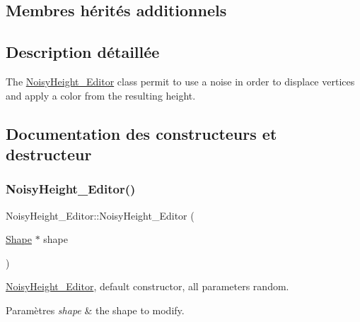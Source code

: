 \subsection*{Membres hérités additionnels}


\subsection{Description détaillée}
The \hyperlink{class_noisy_height___editor}{Noisy\+Height\+\_\+\+Editor} class permit to use a noise in order to displace vertices and apply a color from the resulting height. 

\subsection{Documentation des constructeurs et destructeur}
\mbox{\label{class_noisy_height___editor_ae4535fb17b29bd29d09dcadd5b9384e3}} 
\subsubsection{\texorpdfstring{Noisy\+Height\+\_\+\+Editor()}{NoisyHeight\_Editor()}\hspace{0.1cm}{\footnotesize\ttfamily [1/2]}}
{\footnotesize\ttfamily Noisy\+Height\+\_\+\+Editor\+::\+Noisy\+Height\+\_\+\+Editor (\begin{DoxyParamCaption}\item[{\hyperlink{class_shape}{Shape} $\ast$}]{shape }\end{DoxyParamCaption})}



\hyperlink{class_noisy_height___editor}{Noisy\+Height\+\_\+\+Editor}, default constructor, all parameters random. 


\begin{DoxyParams}{Paramètres}
{\em shape} & the shape to modify. \\
\hline
\end{DoxyParams}
\mbox{\label{class_noisy_height___editor_ac56426a50e5adf94c8b2a4211d0b0c77}} 
